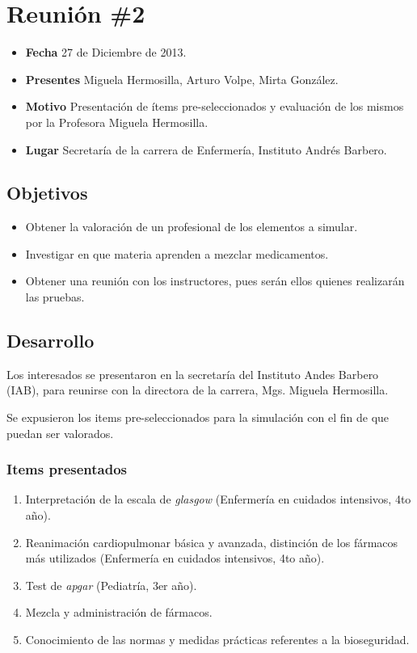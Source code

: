 \section{Reunión \#2}

\begin{itemize}
\itemsep1pt\parskip0pt
\item
  \textbf{Fecha} 27 de Diciembre de 2013.
\item
  \textbf{Presentes} Miguela Hermosilla, Arturo Volpe, Mirta González.
\item
  \textbf{Motivo} Presentación de ítems pre-seleccionados y evaluación
  de los mismos por la Profesora Miguela Hermosilla.
\item
  \textbf{Lugar} Secretaría de la carrera de Enfermería, Instituto
  Andrés Barbero.
\end{itemize}

\subsection{Objetivos}

\begin{itemize}
\itemsep1pt\parskip0pt
\item
  Obtener la valoración de un profesional de los elementos a simular.
\item
  Investigar en que materia aprenden a mezclar medicamentos.
\item
  Obtener una reunión con los instructores, pues serán ellos quienes
  realizarán las pruebas.
\end{itemize}

\subsection{Desarrollo}

Los interesados se presentaron en la secretaría del Instituto Andes
Barbero (IAB), para reunirse con la directora de la carrera, Mgs.
Miguela Hermosilla.

Se expusieron los items pre-seleccionados para la simulación con el fin
de que puedan ser valorados.

\subsubsection{Items presentados}

\begin{enumerate}
\def\labelenumi{\arabic{enumi}.}
\itemsep1pt\parskip0pt
\item
  Interpretación de la escala de \emph{glasgow} (Enfermería en cuidados
  intensivos, 4to año).
\item
  Reanimación cardiopulmonar básica y avanzada, distinción de los
  fármacos más utilizados (Enfermería en cuidados intensivos, 4to año).
\item
  Test de \emph{apgar} (Pediatría, 3er año).
\item
  Mezcla y administración de fármacos.
\item
  Conocimiento de las normas y medidas prácticas referentes a la
  bioseguridad.
\end{enumerate}

